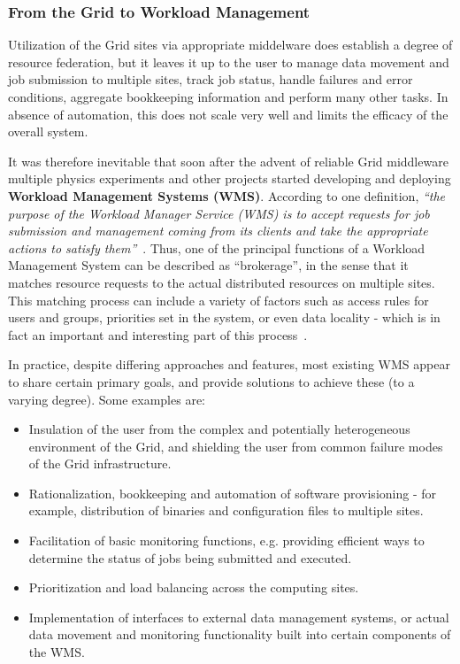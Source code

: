 \subsubsection{From the Grid to Workload Management}
\label{from_grid_to_workload}
Utilization of the Grid sites via appropriate middelware does establish a degree of resource federation, but it leaves it up to the user to manage data movement and job submission to multiple sites,
track job status, handle failures and error conditions, aggregate bookkeeping information and perform many other tasks. In absence of automation, this does not scale very well and limits the efficacy
of the overall system.

It was therefore inevitable that soon after the advent of reliable Grid middleware multiple physics experiments and other projects started developing and deploying \textbf{Workload Management Systems (WMS)}.
 According to one definition,
\textit{``the purpose of the Workload Manager Service (WMS) is to accept requests for job submission and management coming from its clients and take the appropriate actions to satisfy them''}~\cite{egee_user_guide}.
Thus, one of the principal functions of a Workload Management System can be described as ``brokerage'', in the sense that it matches resource requests to the actual distributed resources
on multiple sites. This matching process can include a variety of factors such as access rules for users and groups, priorities set in the system, or even data locality - which is in fact an important and interesting part of this process~\cite{panda_chep10}.

In practice, despite differing approaches and features, most existing WMS appear to share certain primary goals, and provide solutions to achieve these (to a varying degree). Some examples are:

\begin{itemize}

\item Insulation of the user from the complex and potentially heterogeneous environment of the Grid, and shielding the user from common failure modes of the Grid infrastructure.

\item Rationalization, bookkeeping and automation of software provisioning - for example, distribution of binaries and configuration files to multiple sites.

\item Facilitation of basic monitoring functions, e.g. providing efficient ways to determine the status of jobs being submitted and executed.

\item Prioritization and load balancing across the computing sites.

\item Implementation of interfaces to external data management systems, or actual data movement and monitoring functionality built into certain components of the WMS.

\end{itemize}

